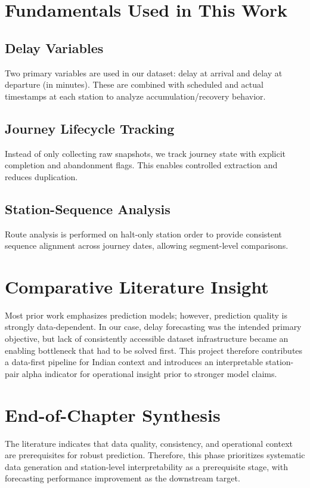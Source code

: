 \documentclass[12pt,a4paper]{report}
\begin{document}
\section{Fundamentals Used in This Work}
\subsection{Delay Variables}
Two primary variables are used in our dataset: delay at arrival and delay at departure (in minutes). These are combined with scheduled and actual timestamps at each station to analyze accumulation/recovery behavior.

\subsection{Journey Lifecycle Tracking}
Instead of only collecting raw snapshots, we track journey state with explicit completion and abandonment flags. This enables controlled extraction and reduces duplication.

\subsection{Station-Sequence Analysis}
Route analysis is performed on halt-only station order to provide consistent sequence alignment across journey dates, allowing segment-level comparisons.

\section{Comparative Literature Insight}
Most prior work emphasizes prediction models; however, prediction quality is strongly data-dependent. In our case, delay forecasting was the intended primary objective, but lack of consistently accessible dataset infrastructure became an enabling bottleneck that had to be solved first. This project therefore contributes a data-first pipeline for Indian context and introduces an interpretable station-pair alpha indicator for operational insight prior to stronger model claims.

\section{End-of-Chapter Synthesis}
The literature indicates that data quality, consistency, and operational context are prerequisites for robust prediction. Therefore, this phase prioritizes systematic data generation and station-level interpretability as a prerequisite stage, with forecasting performance improvement as the downstream target.
\end{document}

